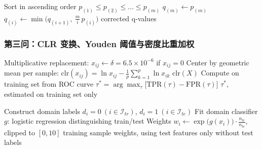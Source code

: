 \begin{algorithm}[H]
\caption{BH-FDR 多重比较校正（第二问）}
\label{alg:s2-fdr}
\begin{algorithmic}[1]
  \State Sort in ascending order $p_{(1)} \le p_{(2)} \le \dots \le p_{(m)}$
  \State $q_{(m)} \gets p_{(m)}$
    \State $q_{(i)} \gets \min\big( q_{(i+1)},\ \tfrac{m}{i}\, p_{(i)} \big)$
  \EndFor
  \State \Return corrected q-values
\EndProcedure
\end{algorithmic}
\end{algorithm}

\subsubsection{第三问：CLR 变换、Youden 阈值与密度比重加权}

\begin{algorithm}[H]
\caption{CLR 变换与 Youden 阈值（第三问）}
\label{alg:s3-clr-youden}
\begin{algorithmic}[1]
  \State Multiplicative replacement: $x_{ij} \leftarrow \delta = 6.5\times10^{-6}$ if $x_{ij} = 0$
  \State Center by geometric mean per sample: $\mathrm{clr}(x_{ij}) = \ln x_{ij} - \tfrac{1}{p}\sum_{k=1}^{p}\ln x_{ik}$
  \State \Return $\mathrm{clr}(X)$
\EndProcedure
{}
  \State Compute on training set from ROC curve $\tau^{*} = \arg\max_{\tau}\big[ \mathrm{TPR}(\tau) - \mathrm{FPR}(\tau) \big]$
  \State \Return $\tau^{*}$, estimated on training set only
\EndProcedure
\end{algorithmic}
\end{algorithm}

\begin{algorithm}[H]
\caption{密度比重加权（第三问，候选模型 R3）}
\label{alg:s3-density}
\begin{algorithmic}[1]
  \State Construct domain labels $d_i = 0\ (i \in \mathcal{I}_{tr})$, $d_i = 1\ (i \in \mathcal{I}_{te})$
  \State Fit domain classifier $g$: logistic regression distinguishing train/test
  \State Weights $w_i \gets \exp\big(g(x_i)\big) \cdot \tfrac{n_{tr}}{n_{te}}$, clipped to $[0, 10]$
  \State \Return training sample weights, using test features only without test labels
\EndProcedure
\end{algorithmic}
\end{algorithm}

